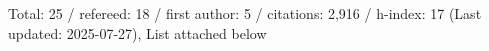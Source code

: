 Total: 25 / refereed: 18 / first author: 5 / citations: 2,916 / h-index: 17 (Last updated: 2025-07-27), List attached below